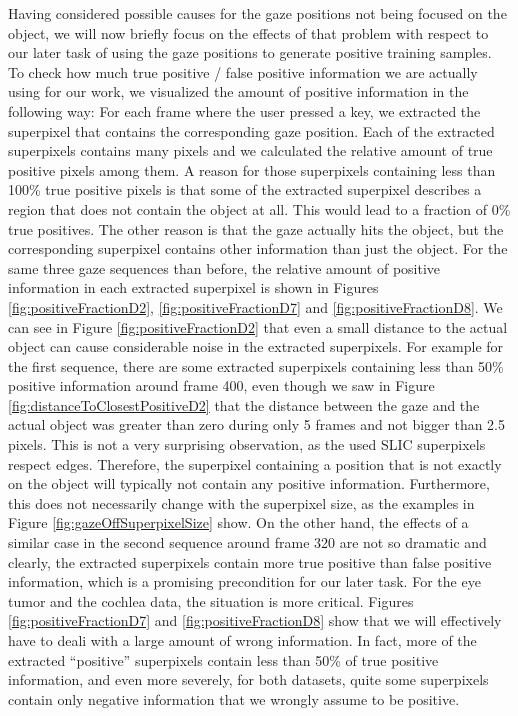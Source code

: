 Having considered possible causes for the gaze positions not being focused on the object, we will now briefly focus on the effects of that problem with respect to our later task of using the gaze positions to generate positive training samples. 
To check how much true positive / false positive information we are actually using for our work, we visualized the amount of positive information in the following way: 
For each frame where the user pressed a key, we extracted the superpixel that contains the corresponding gaze position. 
Each of the extracted superpixels contains many pixels and we calculated the relative amount of true positive pixels among them. 
A reason for those superpixels containing less than 100\% true positive pixels is that some of the extracted superpixel describes a region that does not contain the object at all. 
This would lead to a fraction of 0\% true positives. 
The other reason is that the gaze actually hits the object, but the corresponding superpixel contains other information than just the object. 
For the same three gaze sequences than before, the relative amount of positive information in each extracted superpixel is shown in Figures \ref{fig:positiveFractionD2}, \ref{fig:positiveFractionD7} and \ref{fig:positiveFractionD8}. 
We can see in Figure \ref{fig:positiveFractionD2} that even a small distance to the actual object can cause considerable noise in the extracted superpixels. 
For example for the first sequence, there are some extracted superpixels containing less than 50\% positive information around frame 400, even though we saw in Figure \ref{fig:distanceToClosestPositiveD2} that the distance between the gaze and the actual object was greater than zero during only 5 frames and not bigger than 2.5 pixels. 
This is not a very surprising observation, as the used SLIC superpixels respect edges. 
Therefore, the superpixel containing a position that is not exactly on the object will typically not contain any positive information. Furthermore, this does not necessarily change with the superpixel size, as the examples in Figure \ref{fig:gazeOffSuperpixelSize} show. On the other hand, the effects of a similar case in the second sequence around frame 320 are not so dramatic and clearly, the extracted superpixels contain more true positive than false positive information, which is a promising precondition for our later task. 
For the eye tumor and the cochlea data, the situation is more critical. Figures \ref{fig:positiveFractionD7} and \ref{fig:positiveFractionD8} show that we will effectively have to deali with a large amount of wrong information. In fact, more of the extracted ``positive'' superpixels contain less than 50\% of true positive information, and even more severely, for both datasets, quite some superpixels contain only negative information that we wrongly assume to be positive.

